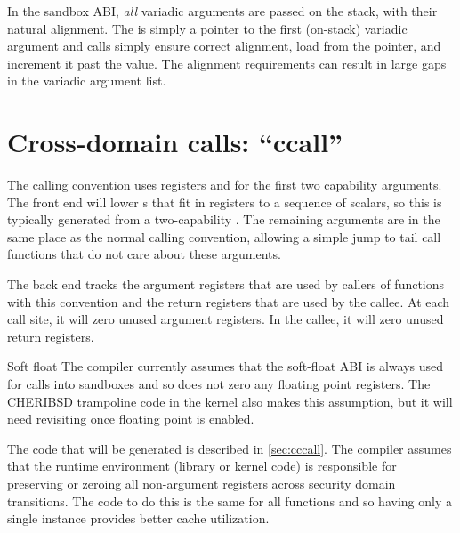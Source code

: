 In the sandbox ABI, \textit{all} variadic arguments are passed on the stack, with their natural alignment.
The  is simply a pointer to the first (on-stack) variadic argument and  calls simply ensure correct alignment, load from the pointer, and increment it past the value.
The alignment requirements can result in large gaps in the variadic argument list.


\section{Cross-domain calls: ``ccall''}

The  calling convention uses registers  and  for the first two capability arguments.
The front end will lower s that fit in registers to a sequence of scalars, so this is typically generated from a two-capability .
The remaining arguments are in the same place as the normal calling convention, allowing a simple jump to tail call functions that do not care about these arguments.

The back end tracks the argument registers that are used by callers of functions with this convention and the return registers that are used by the callee.
At each call site, it will zero unused argument registers.
In the callee, it will zero unused return registers.

\begin{notebox}{Soft float}
	The compiler currently assumes that the soft-float ABI is always used for calls into sandboxes and so does not zero any floating point registers.
	The CHERIBSD trampoline code in the kernel also makes this assumption, but it will need revisiting once floating point is enabled.
\end{notebox}

The code that will be generated is described in \autoref{sec:cccall}.
The compiler assumes that the runtime environment (library or kernel code) is responsible for preserving or zeroing all non-argument registers across security domain transitions.
The code to do this is the same for all functions and so having only a single instance provides better cache utilization.

